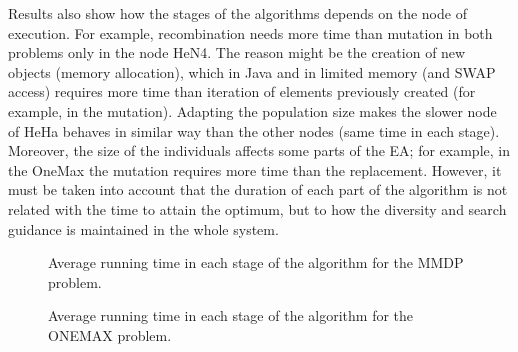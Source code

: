 Results also show how the stages of the algorithms depends on the node
of execution. For example, recombination needs more time than mutation
in both problems only in the node HeN4. The reason might be the
creation of new objects (memory allocation), which in Java and in
limited memory (and SWAP access) requires more time than iteration of
elements previously created (for example, in the mutation). Adapting
the population size makes the slower node of HeHa behaves in similar
way than the other nodes (same time in each stage). Moreover, the size
of the individuals affects some parts of the EA; for example, in the
OneMax the mutation requires more time than the replacement. However,
it must be taken into account that the duration of each part of the
algorithm is not related with the time to attain the optimum, but to
how the diversity and search guidance is maintained in the whole system.  

\begin{figure*}
\centering
{}
\caption{Average running time in each stage of the algorithm for the MMDP problem.}
\label{fig:MMDPbars}
\end{figure*}

\begin{figure*}
\centering
{}
\caption{Average running time in each stage of the algorithm for the ONEMAX problem.}
\label{fig:ONEMAXbars}
\end{figure*}

